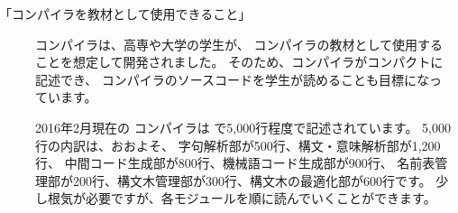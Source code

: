 \begin{description}
\item[「コンパイラを教材として使用できること」]
\cmm コンパイラは、高専や大学の学生が、
コンパイラの教材として使用することを想定して開発されました。
そのため、コンパイラがコンパクトに記述でき、
コンパイラのソースコードを学生が読めることも目標になっています。

2016年2月現在の \cmm コンパイラは \cl で5,000行程度で記述されています。
5,000行の内訳は、おおよそ、
字句解析部が500行、構文・意味解析部が1,200行、
中間コード生成部が800行、機械語コード生成部が900行、
名前表管理部が200行、構文木管理部が300行、構文木の最適化部が600行です。
少し根気が必要ですが、各モジュールを順に読んでいくことができます。

\end{description}
